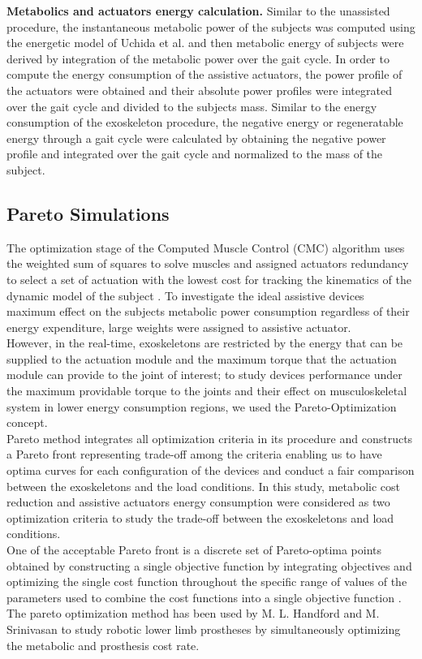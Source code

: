 \documentclass[10pt,letterpaper]{article}
\begin{document}
\vspace{5mm}
\textbf{Metabolics and actuators energy calculation.} Similar to the unassisted procedure, the instantaneous metabolic power of the subjects was computed using the energetic model of Uchida et al. \cite{106} and then metabolic energy of subjects were derived by integration of the metabolic power over the gait cycle. In order to compute the energy consumption of the assistive actuators, the power profile of the actuators were obtained and their absolute power profiles were integrated over the gait cycle and divided to the subjects mass. Similar to the energy consumption of the exoskeleton procedure, the negative energy or regeneratable energy through a gait cycle were calculated by obtaining the negative power profile and integrated over the gait cycle and normalized to the mass of the subject.\\
\subsection*{Pareto Simulations}
The optimization stage of the Computed Muscle Control (CMC) algorithm uses the weighted sum of squares to solve muscles and assigned actuators redundancy to select a set of actuation with the lowest cost for tracking the kinematics of the dynamic model of the subject \cite{92}. To investigate the ideal assistive devices maximum effect on the subjects metabolic power consumption regardless of their energy expenditure, large weights were assigned to assistive actuator.\\
However, in the real-time, exoskeletons are restricted by the energy that can be supplied to the actuation module and the maximum torque that the actuation module can provide to the joint of interest; to study devices performance under the maximum providable torque to the joints and their effect on musculoskeletal system in lower energy consumption regions, we used the Pareto-Optimization concept\cite{113}.\\
Pareto method integrates all optimization criteria in its procedure and constructs a Pareto front representing trade-off among the criteria enabling us to have optima curves for each configuration of the devices \cite{107} and conduct a fair comparison between the exoskeletons and the load conditions. In this study, metabolic cost reduction and assistive actuators energy consumption were considered as two optimization criteria to study the trade-off between the exoskeletons and load conditions.\\
One of the acceptable Pareto front is a discrete set of Pareto-optima points obtained by constructing a single objective function by integrating objectives and optimizing the single cost function throughout the specific range of values of the parameters used to combine the cost functions into a single objective function \cite{108}.\\
The pareto optimization method has been used by M. L. Handford and M. Srinivasan\cite{111,127} to study robotic lower limb prostheses by simultaneously optimizing the metabolic and prosthesis cost rate. \\
\end{document}
